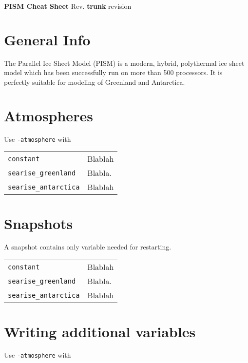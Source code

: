 \documentclass[landscape]{article}
\newcommand{\PISMREV}{\textbf{trunk} revision }
\begin{document}
\begin{center}
     \Large{\textbf{PISM Cheat Sheet} Rev. \PISMREV} \\
\end{center}


\begin{multicols}{3}


\setlength{\premulticols}{1pt}
\setlength{\postmulticols}{1pt}
\setlength{\multicolsep}{1pt}
\setlength{\columnsep}{2pt}

\section{General Info}

The Parallel Ice Sheet Model (PISM) is a modern, hybrid, polythermal
ice sheet model which has been successfully run on more than 500
processors. It is perfectly suitable for modeling of Greenland and Antarctica.

\section{Atmospheres}
Use \verb|-atmosphere| with
 
\begin{tabular}{@{}ll@{}}
\verb|constant|    & Blablah \\
\verb|searise_greenland|  & Blabla. \\
\verb|searise_antarctica|  & Blablah
\end{tabular}

\section{Snapshots}
A snapshot contains only variable needed for restarting.

\begin{tabular}{@{}ll@{}}
\verb|constant|    & Blablah \\
\verb|searise_greenland|  & Blabla. \\
\verb|searise_antarctica|  & Blablah
\end{tabular}

\section{Writing additional variables}
Use \verb|-atmosphere| with
 

\end{multicols}
\end{document}
